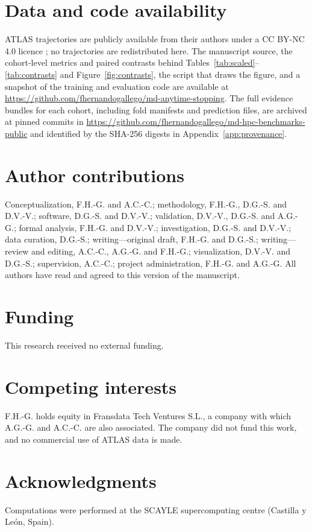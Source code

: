 \documentclass[11pt]{article}
\begin{document}
\section*{Data and code availability}
ATLAS trajectories are publicly available from their authors under a CC BY-NC 4.0 licence \cite{VanderMeersche2024ATLAS}; no trajectories are redistributed here. The manuscript source, the cohort-level metrics and paired contrasts behind Tables~\ref{tab:scaled}--\ref{tab:contrasts} and Figure~\ref{fig:contrasts}, the script that draws the figure, and a snapshot of the training and evaluation code are available at \url{https://github.com/fhernandogallego/md-anytime-stopping}. The full evidence bundles for each cohort, including fold manifests and prediction files, are archived at pinned commits in \url{https://github.com/fhernandogallego/md-hpc-benchmarks-public} and identified by the SHA-256 digests in Appendix~\ref{app:provenance}.

\section*{Author contributions}
Conceptualization, F.H.-G. and A.C.-C.; methodology, F.H.-G., D.G.-S. and D.V.-V.; software, D.G.-S. and D.V.-V.; validation, D.V.-V., D.G.-S. and A.G.-G.; formal analysis, F.H.-G. and D.V.-V.; investigation, D.G.-S. and D.V.-V.; data curation, D.G.-S.; writing---original draft, F.H.-G. and D.G.-S.; writing---review and editing, A.C.-C., A.G.-G. and F.H.-G.; visualization, D.V.-V. and D.G.-S.; supervision, A.C.-C.; project administration, F.H.-G. and A.G.-G. All authors have read and agreed to this version of the manuscript.

\section*{Funding}
This research received no external funding.

\section*{Competing interests}
F.H.-G. holds equity in Fransdata Tech Ventures S.L., a company with which A.G.-G. and A.C.-C. are also associated. The company did not fund this work, and no commercial use of ATLAS data is made.

\section*{Acknowledgments}
Computations were performed at the SCAYLE supercomputing centre (Castilla y Le\'on, Spain).
\end{document}
